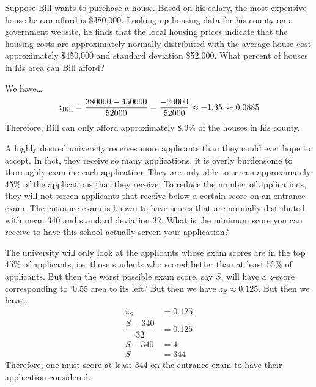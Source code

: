 \documentclass[11pt,letterpaper]{article}
\begin{document}
\newpage



 Suppose Bill wants to purchase a house. Based on his salary, the most expensive house he can afford is \$380,000. Looking up housing data for his county on a government website, he finds that the local housing prices indicate that the housing costs are approximately normally distributed with the average house cost approximately \$450,000 and standard deviation \$52,000. What percent of houses in his area can Bill afford? \pspace

\sol We have\dots
	\[
	z_{\text{Bill}}= \dfrac{380000 - 450000}{52000}= \dfrac{-70000}{52000} \approx -1.35 \rightsquigarrow 0.0885
	\] \pspace
Therefore, Bill can only afford approximately 8.9\% of the houses in his county. 



\newpage



 A highly desired university receives more applicants than they could ever hope to accept. In fact, they receive so many applications, it is overly burdensome to thoroughly examine each application. They are only able to screen approximately 45\% of the applications that they receive. To reduce the number of applications, they will not screen applicants that receive below a certain score on an entrance exam. The entrance exam is known to have scores that are normally distributed with mean 340 and standard deviation 32. What is the minimum score you can receive to have this school actually screen your application? \pspace

\sol The university will only look at the applicants whose exam scores are in the top 45\% of applicants, i.e. those students who scored better than at least 55\% of applicants. But then the worst possible exam score, say $S$, will have a $z$-score corresponding to `0.55 area to its left.' But then we have $z_S \approx 0.125$. But then we have\dots
	\[
	\begin{aligned}
	z_S&= 0.125 \\[0.3cm]
	\dfrac{S - 340}{32}&= 0.125 \\[0.3cm]
	S - 340&= 4 \\[0.3cm]
	S&= 344
	\end{aligned}
	\] \pspace 
Therefore, one must score at least 344 on the entrance exam to have their application considered. 
\end{document}
